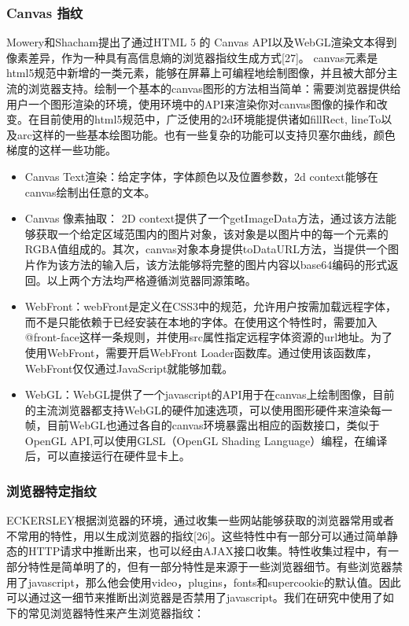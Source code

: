 \documentclass[doctor,privacy,twoside]{buaa_mac}
\begin{document}
\subsubsection{Canvas 指纹}
Mowery和Shacham提出了通过HTML 5 的 Canvas API以及WebGL渲染文本得到像素差异，作为一种具有高信息熵的浏览器指纹生成方式[27]。
canvas元素是html5规范中新增的一类元素，能够在屏幕上可编程地绘制图像，并且被大部分主流的浏览器支持。绘制一个基本的canvas图形的方法相当简单：需要浏览器提供给用户一个图形渲染的环境，使用环境中的API来渲染你对canvas图像的操作和改变。在目前使用的html5规范中，广泛使用的2d环境能提供诸如fillRect, lineTo以及arc这样的一些基本绘图功能。也有一些复杂的功能可以支持贝塞尔曲线，颜色梯度的这样一些功能。

\begin{itemize}
\item Canvas Text渲染：给定字体，字体颜色以及位置参数，2d context能够在canvas绘制出任意的文本。
\item Canvas 像素抽取： 2D context提供了一个getImageData方法，通过该方法能够获取一个给定区域范围内的图片对象，该对象是以图片中的每一个元素的RGBA值组成的。其次，canvas对象本身提供toDataURL方法，当提供一个图片作为该方法的输入后，该方法能够将完整的图片内容以base64编码的形式返回。以上两个方法均严格遵循浏览器同源策略。
\item WebFront：webFront是定义在CSS3中的规范，允许用户按需加载远程字体，而不是只能依赖于已经安装在本地的字体。在使用这个特性时，需要加入@front-face这样一条规则，并使用src属性指定远程字体资源的url地址。为了使用WebFront，需要开启WebFront Loader函数库。通过使用该函数库，WebFront仅仅通过JavaScript就能够加载。
 \item WebGL：WebGL提供了一个javascript的API用于在canvas上绘制图像，目前的主流浏览器都支持WebGL的硬件加速选项，可以使用图形硬件来渲染每一帧，目前WebGL也通过各自的canvas环境暴露出相应的函数接口，类似于OpenGL API,可以使用GLSL（OpenGL Shading Language）编程，在编译后，可以直接运行在硬件显卡上。
 \end{itemize}


\subsubsection{浏览器特定指纹}
ECKERSLEY根据浏览器的环境，通过收集一些网站能够获取的浏览器常用或者不常用的特性，用以生成浏览器的指纹[26]。这些特性中有一部分可以通过简单静态的HTTP请求中推断出来，也可以经由AJAX接口收集。特性收集过程中，有一部分特性是简单明了的，但有一部分特性是来源于一些浏览器细节。有些浏览器禁用了javascript，那么他会使用video，plugins，fonts和supercookie的默认值。因此可以通过这一细节来推断出浏览器是否禁用了javascript。我们在研究中使用了如下的常见浏览器特性来产生浏览器指纹：
\end{document}
